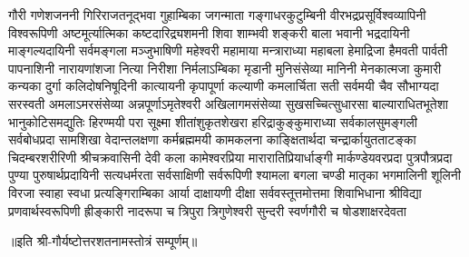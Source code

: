 
\twolineshloka
{गौरी गणेशजननी गिरिराजतनूद्भवा}
{गुहाम्बिका जगन्माता गङ्गाधरकुटुम्बिनी}
\twolineshloka
{वीरभद्रप्रसूर्विश्वव्यापिनी विश्वरूपिणी}
{अष्टमूर्त्यात्मिका कष्टदारिद्र्यशमनी शिवा}
\twolineshloka
{शाम्भवी शङ्करी बाला भवानी भद्रदायिनी}
{माङ्गल्यदायिनी सर्वमङ्गला मञ्जुभाषिणी}
\twolineshloka
{महेश्वरी महामाया मन्त्राराध्या महाबला}
{हेमाद्रिजा हैमवती पार्वती पापनाशिनी}
\twolineshloka
{नारायणांशजा नित्या निरीशा निर्मलाऽम्बिका}
{मृडानी मुनिसंसेव्या मानिनी मेनकात्मजा}
\twolineshloka
{कुमारी कन्यका दुर्गा कलिदोषनिषूदिनी}
{कात्यायनी कृपापूर्णा कल्याणी कमलार्चिता}
\twolineshloka
{सती सर्वमयी चैव सौभाग्यदा सरस्वती}
{अमलाऽमरसंसेव्या अन्नपूर्णाऽमृतेश्वरी}
\twolineshloka
{अखिलागमसंसेव्या सुखसच्चित्सुधारसा}
{बाल्याराधितभूतेशा भानुकोटिसमद्युतिः}
\twolineshloka
{हिरण्मयी परा सूक्ष्मा शीतांशुकृतशेखरा}
{हरिद्राकुङ्कुमाराध्या सर्वकालसुमङ्गली}
\twolineshloka
{सर्वबोधप्रदा सामशिखा वेदान्तलक्षणा}
{कर्मब्रह्ममयी कामकलना काङ्क्षितार्थदा}
\twolineshloka
{चन्द्रार्कायुतताटङ्का चिदम्बरशरीरिणी}
{श्रीचक्रवासिनी देवी कला कामेश्वरप्रिया}
\twolineshloka
{मारारातिप्रियार्धाङ्गी मार्कण्डेयवरप्रदा}
{पुत्रपौत्रप्रदा पुण्या पुरुषार्थप्रदायिनी}
\twolineshloka
{सत्यधर्मरता सर्वसाक्षिणी सर्वरूपिणी}
{श्यामला बगला चण्डी मातृका भगमालिनी}
\twolineshloka
{शूलिनी विरजा स्वाहा स्वधा प्रत्यङ्गिराम्बिका}
{आर्या दाक्षायणी दीक्षा सर्ववस्तूत्तमोत्तमा}
\threelineshloka
{शिवाभिधाना श्रीविद्या प्रणवार्थस्वरूपिणी}
{ह्रीङ्कारी नादरूपा च त्रिपुरा त्रिगुणेश्वरी}
{सुन्दरी स्वर्णगौरी च षोडशाक्षरदेवता}

{॥इति श्री-गौर्यष्टोत्तरशतनामस्तोत्रं सम्पूर्णम्॥}